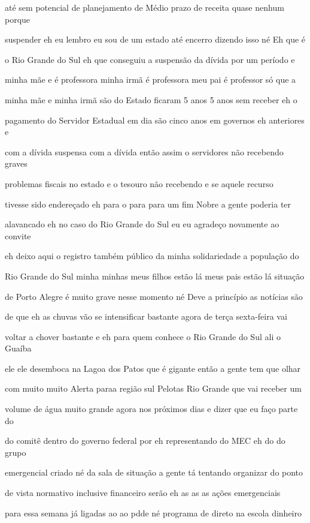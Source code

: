\documentclass[a4paper,12pt]{article}
\begin{document}
até sem potencial de planejamento de Médio prazo de receita quase nenhum porque

suspender eh eu lembro eu sou de um estado até encerro dizendo isso né Eh que é

o Rio Grande do Sul eh que conseguiu a suspensão da dívida por um período e

minha mãe e é professora minha irmã é professora meu pai é professor só que a

minha mãe e minha irmã são do Estado ficaram 5 anos 5 anos sem receber eh o

pagamento do Servidor Estadual em dia são cinco anos em governos eh anteriores e

com a dívida suspensa com a dívida então assim o servidores não recebendo graves

problemas fiscais no estado e o tesouro não recebendo e se aquele recurso

tivesse sido endereçado eh para o para para um fim Nobre a gente poderia ter

alavancado eh no caso do Rio Grande do Sul eu eu agradeço novamente ao convite

eh deixo aqui o registro também público da minha solidariedade a população do

Rio Grande do Sul minha minhas meus filhos estão lá meus pais estão lá situação

de Porto Alegre é muito grave nesse momento né Deve a princípio as notícias são

de que eh as chuvas vão se intensificar bastante agora de terça sexta-feira vai

voltar a chover bastante e eh para quem conhece o Rio Grande do Sul ali o Guaíba

ele ele desemboca na Lagoa dos Patos que é gigante então a gente tem que olhar

com muito muito Alerta paraa região sul Pelotas Rio Grande que vai receber um

volume de água muito grande agora nos próximos dias e dizer que eu faço parte do

do comitê dentro do governo federal por eh representando do MEC eh do do grupo

emergencial criado né da sala de situação a gente tá tentando organizar do ponto

de vista normativo inclusive financeiro serão eh as as as ações emergenciais

para essa semana já ligadas ao ao pdde né programa de direto na escola dinheiro
\end{document}
